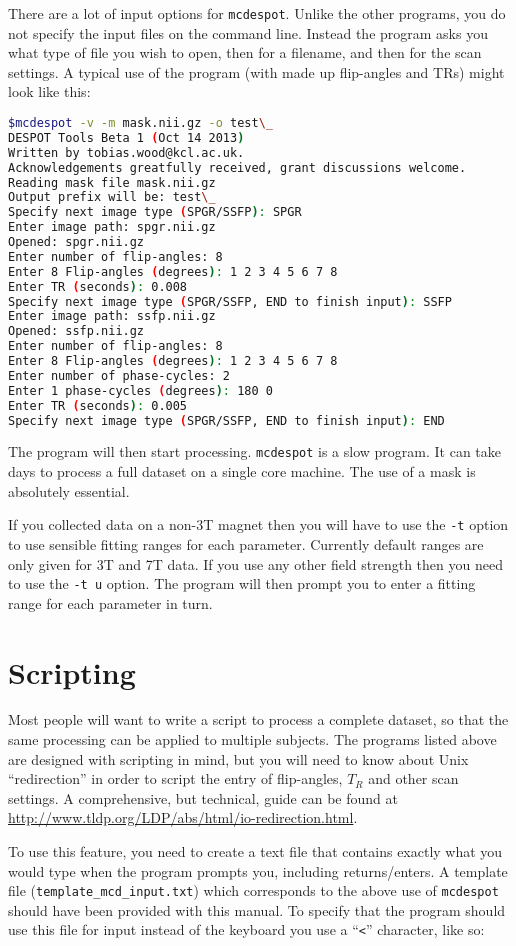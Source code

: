 \documentclass{report}
\begin{document}
There are a lot of input options for \texttt{mcdespot}. Unlike the other programs, you do not specify the input files on the command line. Instead the program asks you what type of file you wish to open, then for a filename, and then for the scan settings. A typical use of the program (with made up flip-angles and TRs) might look like this:
\begin{lstlisting}[language=sh]
$mcdespot -v -m mask.nii.gz -o test\_
DESPOT Tools Beta 1 (Oct 14 2013)
Written by tobias.wood@kcl.ac.uk. 
Acknowledgements greatfully received, grant discussions welcome.
Reading mask file mask.nii.gz
Output prefix will be: test\_
Specify next image type (SPGR/SSFP): SPGR
Enter image path: spgr.nii.gz
Opened: spgr.nii.gz
Enter number of flip-angles: 8
Enter 8 Flip-angles (degrees): 1 2 3 4 5 6 7 8
Enter TR (seconds): 0.008
Specify next image type (SPGR/SSFP, END to finish input): SSFP
Enter image path: ssfp.nii.gz
Opened: ssfp.nii.gz
Enter number of flip-angles: 8
Enter 8 Flip-angles (degrees): 1 2 3 4 5 6 7 8
Enter number of phase-cycles: 2
Enter 1 phase-cycles (degrees): 180 0
Enter TR (seconds): 0.005
Specify next image type (SPGR/SSFP, END to finish input): END
\end{lstlisting}
The program will then start processing. \texttt{mcdespot} is a slow program. It can take days to process a full dataset on a single core machine. The use of a mask is absolutely essential.

If you collected data on a non-3T magnet then you will have to use the \texttt{-t} option to use sensible fitting ranges for each parameter. Currently default ranges are only given for 3T and 7T data. If you use any other field strength then you need to use the \texttt{-t u} option. The program will then prompt you to enter a fitting range for each parameter in turn.

\section{Scripting}\label{scripting}
Most people will want to write a script to process a complete dataset, so that the same processing can be applied to multiple subjects. The programs listed above are designed with scripting in mind, but you will need to know about Unix ``redirection'' in order to script the entry of flip-angles, $T_R$ and other scan settings. A comprehensive, but technical, guide can be found at \url{http://www.tldp.org/LDP/abs/html/io-redirection.html}.

To use this feature, you need to create a text file that contains exactly what you would type when the program prompts you, including returns/enters. A template file (\texttt{template\_mcd\_input.txt}) which corresponds to the above use of \texttt{mcdespot} should have been provided with this manual. To specify that the program should use this file for input instead of the keyboard you use a ``\texttt{<}'' character, like so:
\end{document}
